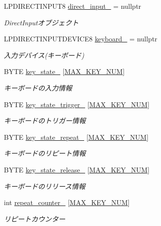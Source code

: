 \begin{DoxyCompactItemize}
\item 
L\+P\+D\+I\+R\+E\+C\+T\+I\+N\+P\+U\+T8 \mbox{\hyperlink{class_keyboard_a490b43137055dd864119b4a37966445b}{direct\+\_\+input\+\_\+}} = nullptr
\begin{DoxyCompactList}\small\item\em Direct\+Inputオブジェクト \end{DoxyCompactList}\item 
L\+P\+D\+I\+R\+E\+C\+T\+I\+N\+P\+U\+T\+D\+E\+V\+I\+C\+E8 \mbox{\hyperlink{class_keyboard_aa903ad645e8801546cacb1ad646b2ecc}{keyboard\+\_\+}} = nullptr
\begin{DoxyCompactList}\small\item\em 入力デバイス(キーボード) \end{DoxyCompactList}\item 
B\+Y\+TE \mbox{\hyperlink{class_keyboard_a5479f751fc72ea8e1a89a0e0c3ac3141}{key\+\_\+state\+\_\+}} \mbox{[}\mbox{\hyperlink{class_keyboard_ab151afccd1372a53748e225c7c98e65e}{M\+A\+X\+\_\+\+K\+E\+Y\+\_\+\+N\+UM}}\mbox{]}
\begin{DoxyCompactList}\small\item\em キーボードの入力情報 \end{DoxyCompactList}\item 
B\+Y\+TE \mbox{\hyperlink{class_keyboard_a00b5e2a9b2071056ba3fe1ba07231a7b}{key\+\_\+state\+\_\+trigger\+\_\+}} \mbox{[}\mbox{\hyperlink{class_keyboard_ab151afccd1372a53748e225c7c98e65e}{M\+A\+X\+\_\+\+K\+E\+Y\+\_\+\+N\+UM}}\mbox{]}
\begin{DoxyCompactList}\small\item\em キーボードのトリガー情報 \end{DoxyCompactList}\item 
B\+Y\+TE \mbox{\hyperlink{class_keyboard_a98cd407cc6d5a7a4d8676b887149110f}{key\+\_\+state\+\_\+repeat\+\_\+}} \mbox{[}\mbox{\hyperlink{class_keyboard_ab151afccd1372a53748e225c7c98e65e}{M\+A\+X\+\_\+\+K\+E\+Y\+\_\+\+N\+UM}}\mbox{]}
\begin{DoxyCompactList}\small\item\em キーボードのリピート情報 \end{DoxyCompactList}\item 
B\+Y\+TE \mbox{\hyperlink{class_keyboard_ad3dfea2e28ccb3491f2b8f525fd43d16}{key\+\_\+state\+\_\+release\+\_\+}} \mbox{[}\mbox{\hyperlink{class_keyboard_ab151afccd1372a53748e225c7c98e65e}{M\+A\+X\+\_\+\+K\+E\+Y\+\_\+\+N\+UM}}\mbox{]}
\begin{DoxyCompactList}\small\item\em キーボードのリリース情報 \end{DoxyCompactList}\item 
int \mbox{\hyperlink{class_keyboard_a1f97dc50d345892d74a8960d79b7d6bc}{repeat\+\_\+counter\+\_\+}} \mbox{[}\mbox{\hyperlink{class_keyboard_ab151afccd1372a53748e225c7c98e65e}{M\+A\+X\+\_\+\+K\+E\+Y\+\_\+\+N\+UM}}\mbox{]}
\begin{DoxyCompactList}\small\item\em リピートカウンター \end{DoxyCompactList}\end{DoxyCompactItemize}
